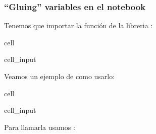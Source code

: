 \documentclass[letterpaper,10pt,english]{jupyterBook}
\begin{document}
\subsubsection{“Gluing” variables en el notebook}
\label{\detokenize{docs/01_01_Code_Blocks:gluing-variables-en-el-notebook}}
\sphinxAtStartPar
Tenemos que importar la función  de la libreria :

\begin{sphinxuseclass}{cell}\begin{sphinxVerbatimInput}

\begin{sphinxuseclass}{cell_input}
\begin{sphinxVerbatim}[commandchars=\\\{\}]
   
\end{sphinxVerbatim}

\end{sphinxuseclass}\end{sphinxVerbatimInput}

\end{sphinxuseclass}
\sphinxAtStartPar
Veamos un ejemplo de como usarlo:

\begin{sphinxuseclass}{cell}\begin{sphinxVerbatimInput}

\begin{sphinxuseclass}{cell_input}
\begin{sphinxVerbatim}[commandchars=\\\{\}]
  
   
\end{sphinxVerbatim}

\end{sphinxuseclass}\end{sphinxVerbatimInput}

\end{sphinxuseclass}
\sphinxAtStartPar
Para llamarla usamos : 
\end{document}
